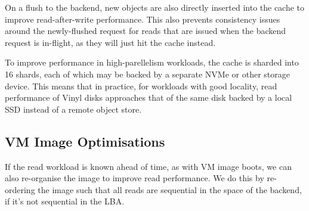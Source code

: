 On a flush to the backend, new objects are also directly inserted into the cache
to improve read-after-write performance. This also prevents consistency issues
around the newly-flushed request for reads that are issued when the backend
request is in-flight, as they will just hit the cache instead.

To improve performance in high-parellelism workloads, the cache is sharded into
16 shards, each of which may be backed by a separate NVMe or other storage
device. This means that in practice, for workloads with good locality, read
performance of Vinyl disks approaches that of the same disk backed by a local
SSD instead of a remote object store.

\subsection{VM Image Optimisations}

If the read workload is known ahead of time, as with VM image boots, we can also
re-organise the image to improve read performance. We do this by re-ordering the
image such that all reads are sequential in the space of the backend, if it's
not sequential in the LBA.

